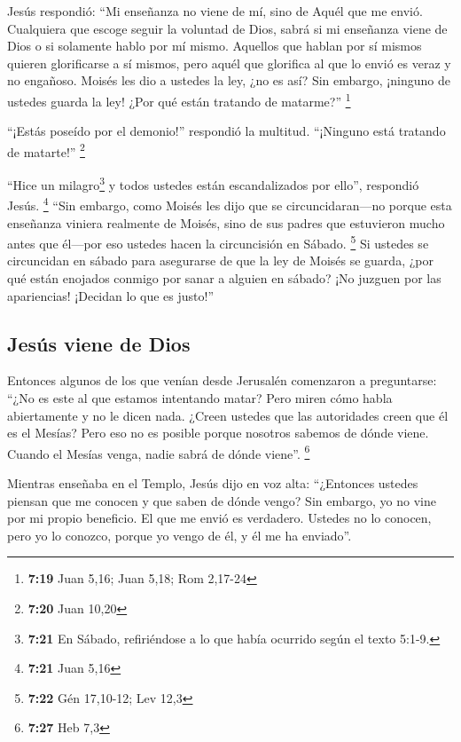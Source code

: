  Jesús respondió: ``Mi enseñanza no viene de mí, sino de
Aquél que me envió.  Cualquiera que escoge seguir la
voluntad de Dios, sabrá si mi enseñanza viene de Dios o si solamente
hablo por mí mismo.  Aquellos que hablan por sí mismos
quieren glorificarse a sí mismos, pero aquél que glorifica al que lo
envió es veraz y no engañoso.  Moisés les dio a ustedes
la ley, ¿no es así? Sin embargo, ¡ninguno de ustedes guarda la ley! ¿Por
qué están tratando de matarme?'' \footnote{\textbf{7:19} Juan 5,16; Juan
  5,18; Rom 2,17-24}

 ``¡Estás poseído por el demonio!'' respondió la
multitud. ``¡Ninguno está tratando de matarte!'' \footnote{\textbf{7:20}
  Juan 10,20}

 ``Hice un milagro\footnote{\textbf{7:21} En Sábado,
  refiriéndose a lo que había ocurrido según el texto 5:1-9.} y todos
ustedes están escandalizados por ello'', respondió Jesús. \footnote{\textbf{7:21}
  Juan 5,16}  ``Sin embargo, como Moisés les dijo que se
circuncidaran---no porque esta enseñanza viniera realmente de Moisés,
sino de sus padres que estuvieron mucho antes que él---por eso ustedes
hacen la circuncisión en Sábado. \footnote{\textbf{7:22} Gén 17,10-12;
  Lev 12,3}  Si ustedes se circuncidan en sábado para
asegurarse de que la ley de Moisés se guarda, ¿por qué están enojados
conmigo por sanar a alguien en sábado?  ¡No juzguen por
las apariencias! ¡Decidan lo que es justo!''

\hypertarget{jesuxfas-viene-de-dios}{%
\subsection{Jesús viene de Dios}\label{jesuxfas-viene-de-dios}}

 Entonces algunos de los que venían desde Jerusalén
comenzaron a preguntarse: ``¿No es este al que estamos intentando matar?
 Pero miren cómo habla abiertamente y no le dicen nada.
¿Creen ustedes que las autoridades creen que él es el Mesías?
 Pero eso no es posible porque nosotros sabemos de dónde
viene. Cuando el Mesías venga, nadie sabrá de dónde viene''. \footnote{\textbf{7:27}
  Heb 7,3}

 Mientras enseñaba en el Templo, Jesús dijo en voz alta:
``¿Entonces ustedes piensan que me conocen y que saben de dónde vengo?
Sin embargo, yo no vine por mi propio beneficio. El que me envió es
verdadero. Ustedes no lo conocen,  pero yo lo conozco,
porque yo vengo de él, y él me ha enviado''.

